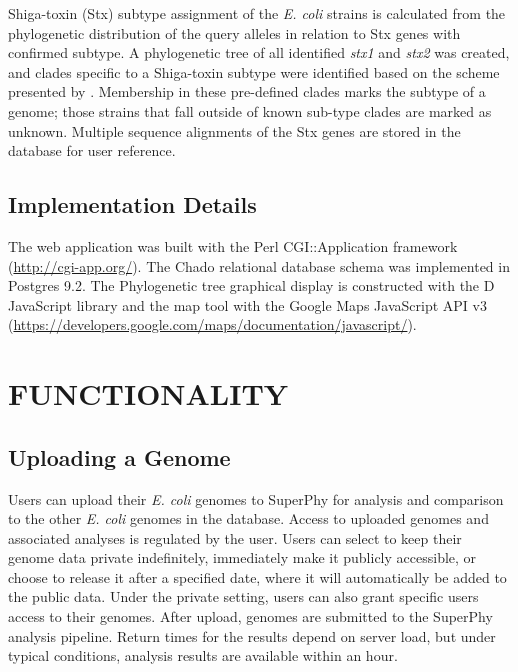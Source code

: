 \documentclass[a4paper,twoside]{article}
\begin{document}
Shiga-toxin (Stx) subtype assignment of the \textit{E. coli} strains is calculated from the phylogenetic distribution of the query alleles in relation to Stx genes with confirmed subtype. A phylogenetic tree of all identified \textit{stx1} and \textit{stx2} was created, and clades specific to a Shiga-toxin subtype were identified based on the scheme presented by \cite{scheutz_multicenter_2012}. Membership in these pre-defined clades marks the subtype of a genome; those strains that fall outside of known sub-type clades are marked as unknown. Multiple sequence alignments of the Stx genes are stored in the database for user reference.

\subsection{Implementation Details}

The web application was built with the Perl CGI::Application framework (\url{http://cgi-app.org/}). The Chado relational database schema was implemented in Postgres 9.2. The Phylogenetic tree graphical display is constructed with the D JavaScript library \cite{bostock2011d3} and the map tool with the Google Maps JavaScript API v3 (\url{https://developers.google.com/maps/documentation/javascript/}).

\section{\uppercase{Functionality}}
\label{sec:functionality}

\subsection{Uploading a Genome}

Users can upload their \textit{E. coli} genomes to SuperPhy for analysis and comparison to the other \textit{E. coli} genomes in the database.  Access to uploaded genomes and associated analyses is regulated by the user. Users can select to keep their genome data private indefinitely, immediately make it publicly accessible, or choose to release it after a specified date, where it will automatically be added to the public data.  Under the private setting, users can also grant specific users access to their genomes. After upload, genomes are submitted to the SuperPhy analysis pipeline. Return times for the results depend on server load, but under typical conditions, analysis results are available within an hour.
\end{document}
